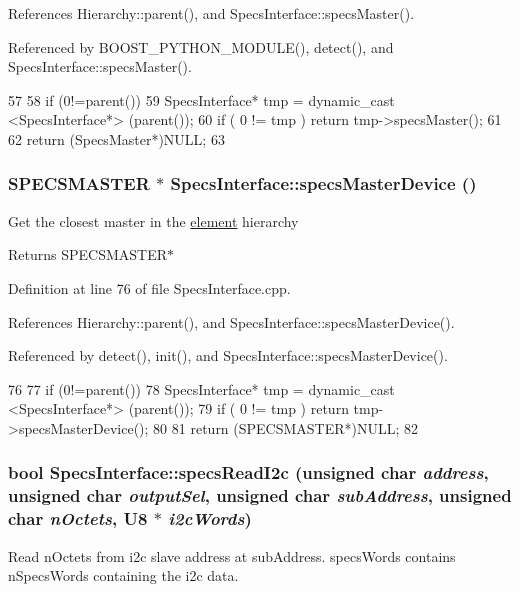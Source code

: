 References Hierarchy::parent(), and SpecsInterface::specsMaster().

Referenced by BOOST\_\-PYTHON\_\-MODULE(), detect(), and SpecsInterface::specsMaster().


\begin{DoxyCode}
57                                         {
58     if (0!=parent()){
59     SpecsInterface* tmp = dynamic_cast <SpecsInterface*> (parent());
60     if ( 0 != tmp ) return tmp->specsMaster();
61   }
62   return (SpecsMaster*)NULL;
63 }
\end{DoxyCode}
\hypertarget{classSpecsInterface_aa8aeaa74acf2c913905ea996d153a6ef}{
\subsubsection[{specsMasterDevice}]{\setlength{\rightskip}{0pt plus 5cm}SPECSMASTER $\ast$ SpecsInterface::specsMasterDevice ()}}
\label{classSpecsInterface_aa8aeaa74acf2c913905ea996d153a6ef}
Get the closest master in the \hyperlink{namespaceelement}{element} hierarchy \begin{DoxyReturn}{Returns}
SPECSMASTER$\ast$ 
\end{DoxyReturn}


Definition at line 76 of file SpecsInterface.cpp.

References Hierarchy::parent(), and SpecsInterface::specsMasterDevice().

Referenced by detect(), init(), and SpecsInterface::specsMasterDevice().


\begin{DoxyCode}
76                                               {
77     if (0!=parent()){
78     SpecsInterface* tmp = dynamic_cast <SpecsInterface*> (parent());
79     if ( 0 != tmp ) return tmp->specsMasterDevice();
80     }
81   return (SPECSMASTER*)NULL;
82 }
\end{DoxyCode}
\hypertarget{classSpecsInterface_ad27047eaae1bc333ee0c1a6c871a407b}{
\subsubsection[{specsReadI2c}]{\setlength{\rightskip}{0pt plus 5cm}bool SpecsInterface::specsReadI2c (unsigned char {\em address}, \/  unsigned char {\em outputSel}, \/  unsigned char {\em subAddress}, \/  unsigned char {\em nOctets}, \/  {\bf U8} $\ast$ {\em i2cWords})}}
\label{classSpecsInterface_ad27047eaae1bc333ee0c1a6c871a407b}
Read nOctets from i2c slave address at subAddress. specsWords contains nSpecsWords containing the i2c data.

